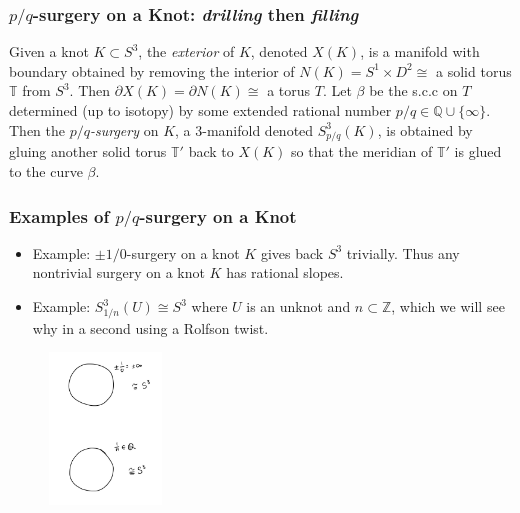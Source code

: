 \documentclass{beamer}
\theoremstyle{ex}
\theoremstyle{rem}
\begin{document}
	\begin{frame}
		\frametitle{$p/q$-surgery on a Knot: \textit{drilling} then \textit{filling}}
		\begin{definition}
		Given a knot $K \subset S^3$, the \textit{exterior} of $K$, denoted $X(K)$, is a manifold with boundary obtained by removing the interior of $N(K) = S^1 \times D^2 \cong$ a solid torus $\mathbb{T}$ from $S^3$. Then $\partial X(K) = \partial N(K) \cong$ a torus $T$. Let $\beta$ be the s.c.c on $T$ determined (up to isotopy) by some extended rational number $p/q \in \mathbb{Q}\cup\{\infty\}$. Then the \textit{$p/q$-surgery} on $K$, a $3$-manifold denoted $S^3_{p/q}(K)$, is obtained by gluing another solid torus $\mathbb{T'}$ back to $X(K)$ so that the meridian of $\mathbb{T'}$ is glued to the curve $\beta$. 
		\end{definition}
	\end{frame}

	\begin{frame}
	\frametitle{Examples of $p/q$-surgery on a Knot}
		\begin{itemize}
		\item Example: $\pm 1/0$-surgery on a knot $K$ gives back $S^3$ trivially. Thus any nontrivial surgery on a knot $K$ has rational slopes.  			
		\end{itemize}
		\begin{itemize}
		\item Example: $S^3_{1/n}(U) \cong S^3$ where $U$ is an unknot and $n \subset \mathbb{Z}$, which we will see why in a second using a Rolfson twist. 
		\end{itemize}
		\begin{figure}
			\centering
			\includegraphics[width=30mm]{Unknot.jpg}
		\end{figure}	
	\end{frame}
\end{document}
